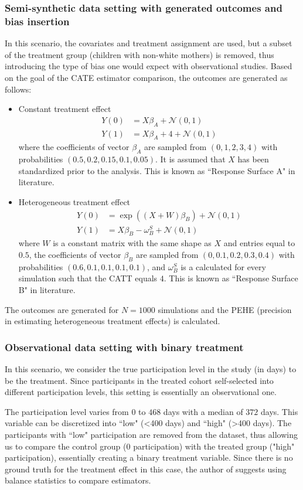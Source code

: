 \documentclass[10pt,letterpaper]{article}
\begin{document}
	\subsubsection{Semi-synthetic data setting with generated outcomes and bias insertion}
	In this scenario, the covariates and treatment assignment are used, but a subset of the treatment group (children with non-white mothers) is removed, thus introducing the type of bias one would expect with observational studies. Based on the goal of the CATE estimator comparison, the outcomes are generated as follows:
	\begin{itemize}
		\item Constant treatment effect
		\begin{align*}
		Y(0) & = X\beta_A + \mathcal{N}(0, 1)\\
		Y(1) & = X\beta_A + 4 + \mathcal{N}(0, 1)
		\end{align*}
	where the coefficients of vector $\beta_A$ are sampled from $(0,1,2,3,4)$ with probabilities $(0.5, 0.2, 0.15, 0.1, 0.05)$. It is assumed that $X$ has been standardized prior to the analysis. This is known as ``Response Surface A" in literature. 
		\item Heterogeneous treatment effect 
		\begin{align*}
		Y(0) & = \exp\left((X+W)\beta_B\right) + \mathcal{N}(0, 1)\\
		Y(1) & = X\beta_B - \omega_B^S + \mathcal{N}(0, 1)
		\end{align*}
	where $W$ is a constant matrix with the same shape as $X$ and entries equal to $0.5$, the coefficients of vector $\beta_B$ are sampled from $(0,0.1,0.2,0.3,0.4)$ with probabilities $(0.6, 0.1, 0.1, 0.1, 0.1)$, and $\omega_B^S$ is a calculated for every simulation such that the CATT equals $4$. This is known as ``Response Surface B" in literature. 
	\end{itemize}
	The outcomes are generated for $N=1000$ simulations and the PEHE (precision in estimating heterogeneous treatment effects) is calculated.
	\subsubsection{Observational data setting with binary treatment}
	In this scenario, we consider the true participation level in the study (in days) to be the treatment. Since participants in the treated cohort self-selected into different participation levels, this setting is essentially an observational one.
	
	The participation level varies from $0$ to $468$ days with a median of $372$ days. This variable can be discretized into ``low" (\textless 400 days) and ``high" (\textgreater 400 days). The participants with ``low" participation are removed from the dataset, thus allowing us to compare the control group ($0$ participation) with the treated group ("high" participation), essentially creating a binary treatment variable. Since there is no ground truth for the treatment effect in this case, the author of \cite{hill2011bayesian} suggests using balance statistics to compare estimators.
\end{document}

